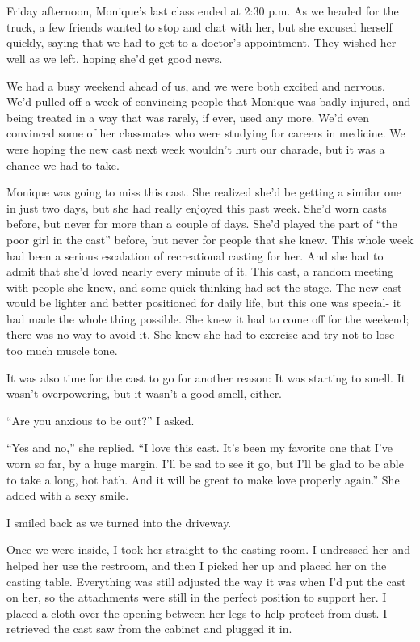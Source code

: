 \chapter{}
Friday afternoon, Monique's last class ended at 2:30 p.m. As we headed for the truck, a few
friends wanted to stop and chat with her, but she excused herself quickly, saying that we had to
get to a doctor's appointment. They wished her well as we left, hoping she'd get good news.

We had a busy weekend ahead of us, and we were both excited and nervous. We'd pulled off a
week of convincing people that Monique was badly injured, and being treated in a way that was
rarely, if ever, used any more. We'd even convinced some of her classmates who were studying for
careers in medicine. We were hoping the new cast next week wouldn't hurt our charade, but it was
a chance we had to take.

\begin{thought}
Monique was going to miss this cast. She realized she'd be getting a similar one in just
two days, but she had really enjoyed this past week. She'd worn casts before, but never for more
than a couple of days. She'd played the part of ``the poor girl in the cast'' before, but never
for people that she knew. This whole week had been a serious escalation of recreational casting
for her. And she had to admit that she'd loved nearly every minute of it. This cast, a random
meeting with people she knew, and some quick thinking had set the stage. The new cast would be
lighter and better positioned for daily life, but this one was special- it had made the whole
thing possible. She knew it had to come off for the weekend; there was no way to avoid it. She
knew she had to exercise and try not to lose too much muscle tone.

It was also time for the cast to go for another reason: It was starting to smell. It wasn't
overpowering, but it wasn't a good smell, either.
\end{thought}

``Are you anxious to be out?'' I asked.

``Yes and no,'' she replied. ``I love this cast. It's been my favorite one that I've worn so
far, by a huge margin. I'll be sad to see it go, but I'll be glad to be able to take a long, hot
bath. And it will be great to make love properly again.'' She added with a sexy smile.

I smiled back as we turned into the driveway.

Once we were inside, I took her straight to the casting room. I undressed her and helped
her use the restroom, and then I picked her up and placed her on the casting table. Everything
was still adjusted the way it was when I'd put the cast on her, so the attachments were still in
the perfect position to support her. I placed a cloth over the opening between her legs to help
protect from dust. I retrieved the cast saw from the cabinet and plugged it in.

